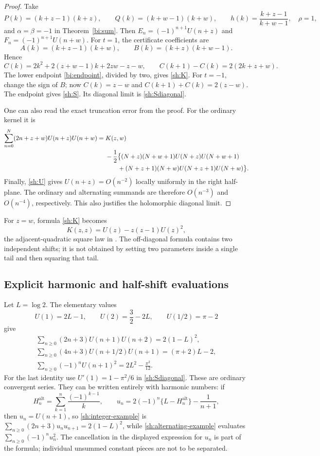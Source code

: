 \begin{proof}
Take
\[
 P(k)=(k+z-1)(k+z),\qquad Q(k)=(k+w-1)(k+w),
 \qquad h(k)=\frac{k+z-1}{k+w-1},\quad\rho=1,
\]
and $\alpha=\beta=-1$ in Theorem~\ref{bi:sum}. Then
$E_n=(-1)^{n+1}U(n+z)$ and $F_n=(-1)^{n+1}U(n+w)$.
For $t=1$, the certificate coefficients are
\[
 A(k)=(k+z-1)(k+w),\qquad B(k)=(k+z)(k+w-1).
\]
Hence
\[
 C(k)=2k^2+2(z+w-1)k+2zw-z-w,\qquad
 C(k+1)-C(k)=2(2k+z+w).
\]
The lower endpoint \eqref{bi:endpoint}, divided by two, gives
\eqref{sh:K}. For $t=-1$, change the sign of $B$; now
$C(k)=z-w$ and $C(k+1)+C(k)=2(z-w)$.
The endpoint gives \eqref{sh:S}. Its diagonal limit is
\eqref{sh:Sdiagonal}.

One can also read the exact truncation error from the proof. For the
ordinary kernel it is
\begin{align}\label{sh:finite-endpoint}
 \sum_{n=0}^N(2n+z+w)U(n+z)U(n+w)
 ={}&K(z,w)\notag\\
 &-\frac12\bigl\{(N+z)(N+w+1)U(N+z)U(N+w+1)\notag\\
 &\qquad +(N+z+1)(N+w)U(N+z+1)U(N+w)\bigr\}.
\end{align}
Finally, \eqref{sh:U} gives $U(n+z)=O(n^{-2})$ locally uniformly
in the right half-plane. The ordinary and alternating summands are
therefore $O(n^{-3})$ and $O(n^{-4})$, respectively. This also
justifies the holomorphic diagonal limit.
\end{proof}

For $z=w$, formula \eqref{sh:K} becomes
\[
 K(z,z)=U(z)-z(z-1)U(z)^2,
\]
the adjacent-quadratic square law in \cite{tail-alternating}.
The off-diagonal formula contains two independent shifts; it is not
obtained by setting two parameters inside a single tail and then
squaring that tail.

\subsection{Explicit harmonic and half-shift evaluations}

Let $L=\log2$. The elementary values
\[
 U(1)=2L-1,\qquad U(2)=\frac32-2L,\qquad
 U(1/2)=\pi-2
\]
give
\begin{align}
 \boxed{\sum_{n\ge0}(2n+3)U(n+1)U(n+2)=2(1-L)^2,}
       \label{sh:integer-example}\\
 \boxed{\sum_{n\ge0}(4n+3)U(n+1/2)U(n+1)=(\pi+2)L-2,}
       \label{sh:half-example}\\
 \boxed{\sum_{n\ge0}(-1)^nU(n+1)^2=2L^2-\frac{\pi^2}{12}.}
       \label{sh:alternating-example}
\end{align}
For the last identity use $U'(1)=1-\pi^2/6$ in
\eqref{sh:Sdiagonal}. These are ordinary convergent series.
They can be written entirely with harmonic numbers: if
\[
 H_n^{\mathrm{alt}}=\sum_{k=1}^n\frac{(-1)^{k-1}}k,
 \qquad u_n=2(-1)^n\{L-H_n^{\mathrm{alt}}\}-\frac1{n+1},
\]
then $u_n=U(n+1)$, so \eqref{sh:integer-example} is
$\sum_{n\ge0}(2n+3)u_nu_{n+1}=2(1-L)^2$, while
\eqref{sh:alternating-example} evaluates $\sum_{n\ge0}(-1)^nu_n^2$.
The cancellation in the displayed expression for $u_n$ is part of
the formula; individual unsummed constant pieces are not to be separated.

